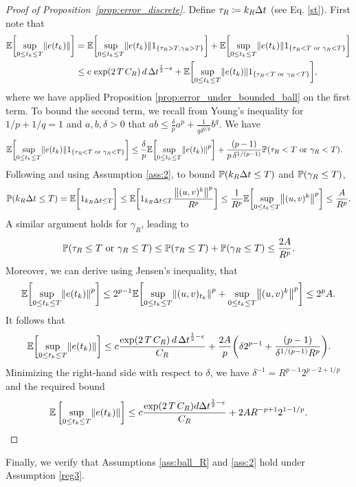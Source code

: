 \documentclass[11pt, twoside]{report}
\begin{document}
\begin{proof}[Proof of Proposition~\ref{prop:error_discrete}]
Define $\tau_R\coloneq k_R{\Delta t}$ (see Eq. \ref{st}). 
 First note that
    \begin{align*}
        \EE\bp{ \sup_{0\leq t_k\leq T} \norm{e(t_k)}}  
        &= \EE\bp{\sup_{0\leq t_k\leq T} \norm{e(t_k)} 1_{\ens{\tau_R>T, \gamma_R>T}}} +  \EE\bp{ \sup_{0\leq t_k\leq T} \norm{e(t_k)} 1_{\ens{\tau_R< T \text{ or } \gamma_R<T}}} \\
        &\leq c \,\exp\pa{2\,T\, C_R} \,d \,\deltat^{\frac12-\epsilon} + \EE\bp{ \sup_{0\leq t_k\leq T} \norm{e(t_k)} 1_{\ens{\tau_R< T \text{ or } \gamma_R<T}}},
    \end{align*}
    where we have applied Proposition \ref{prop:error_under_bounded_ball} on the first term. To bound the second term, we recall from Young's inequality for $1/p+1/q=1$ and $a,b,\delta>0$ that $ab \leq \frac{\delta}{p} a^p + \frac{1}{q\delta^{q/p}} b^q.$ We have
    \begin{align*}
        &\EE\bp{ \sup_{0\leq t_k\leq T} \norm{e(t_k)} 1_{\ens{\tau_R< T \text{ or } \gamma_R<T}}}
        \leq  \frac{\delta}{p}\EE\bp{ \sup_{0\leq t_k\leq T} \norm{e(t_k)}^p} + \frac{(p-1)}{p\,\delta^{1/(p-1)}} \PP\pa{\tau_R< T \text{ or } \gamma_R<T}.
    \end{align*}   
Following \cite{higham2002strong} and using Assumption \ref{ass:2}, to bound $\mathbb{P}(k_R{\Delta t} \leq T)$ and $\PP\pa{\gamma_R \leq T}$, 
$$
\PP(k_R \deltat \leq T) = \EE\biggl[ 1_{k_R\deltat \leq T}\biggr] \leq \EE\biggl[ 1_{k_R\deltat \leq T} \frac{\norm{(u,v)^k}^p}{R^p}\biggr]
\leq \frac{1}{R^p} \EE\biggl[\sup_{0\leq t_k \leq T} \norm{(u,v)^k}^p\biggr] \leq \frac{A}{R^p}.
$$
A similar argument holds for $\gamma_R$, leading to
    $$\PP\pa{\tau_R \leq T \text{ or } \gamma_R \leq T} \leq
    \PP\pa{\tau_R \leq T} + \PP\pa{\gamma_R \leq T} \leq \frac{2A}{R^p}.
    $$
Moreover, we can derive using Jensen's inequality, that
    $$
    \EE\biggl[\sup_{0\leq t_k\leq T} \norm{e(t_k)}^p\biggr] \leq 2^{p-1}\EE\bp{\sup_{0\leq t_k\leq T} \norm{(u,v)_{t_k}}^p + \sup_{0\leq t_k\leq T} \norm{(u,v)^k}^p} \leq 2^p A.
    $$
    It follows that 
$$
\EE\bp{ \sup_{0\leq t_k\leq T} \norm{e(t_k)} } \leq  c\frac{ \exp(2\,T \,C_R) \,d \,\deltat^{\frac12-\epsilon}}{C_R} + \frac{2A}{p} \pa{ \delta 2^{p-1}   +  \frac{(p-1)}{\delta^{1/(p-1)}R^p}}.
$$
Minimizing the right-hand side with respect to $\delta$, we have $\delta^{-1} = R^{p-1} 2^{p-2+1/p}$ and the required bound
$$
\EE\left[ \sup_{0\leq t_k\leq T} \norm{e(t_k)} \right] \leq  c\frac{ \exp\pa{2\,T\, C_R} d \deltat^{\frac12-\epsilon} }{C_R} +  2A R^{-p+1} 2^{1-1/p}.
$$
\end{proof}
Finally, we verify  that Assumptions \ref{ass:ball_R} and \ref{ass:2} hold under Assumption \ref{reg3}.
\end{document}
